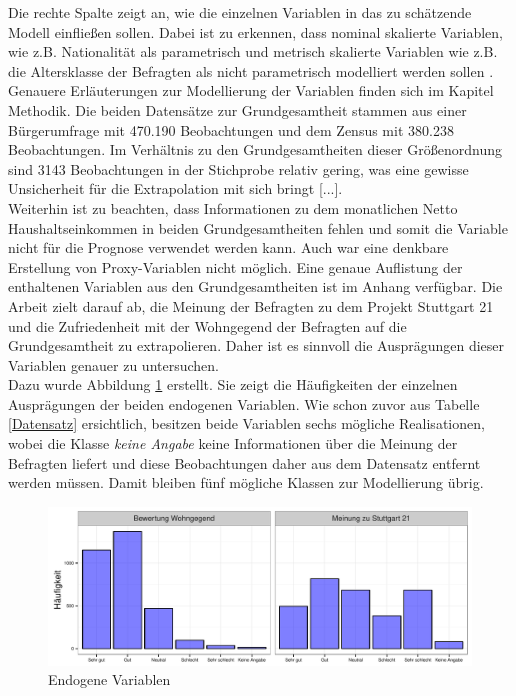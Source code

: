 \documentclass{Vorlage}
\begin{document}
Die rechte Spalte zeigt an, wie die einzelnen Variablen in das zu schätzende Modell einfließen sollen. Dabei ist zu erkennen, dass nominal skalierte Variablen, wie z.B. Nationalität als parametrisch und metrisch skalierte Variablen wie z.B. die Altersklasse der Befragten als nicht parametrisch modelliert werden sollen \cite[p. 9]{fahrmeir2009regression}. Genauere Erläuterungen zur Modellierung der Variablen finden sich im Kapitel Methodik. Die beiden Datensätze zur Grundgesamtheit stammen aus einer Bürgerumfrage mit 470.190 Beobachtungen und dem Zensus mit 380.238 Beobachtungen. Im Verhältnis zu den Grundgesamtheiten  dieser Größenordnung sind 3143 Beobachtungen in der Stichprobe relativ gering, was eine gewisse Unsicherheit für die Extrapolation mit sich bringt [...].\\
Weiterhin ist zu beachten, dass Informationen zu dem monatlichen Netto Haushaltseinkommen in beiden Grundgesamtheiten fehlen und somit die Variable nicht für die Prognose verwendet werden kann. Auch war eine denkbare Erstellung von Proxy-Variablen nicht möglich. Eine genaue Auflistung der enthaltenen Variablen aus den Grundgesamtheiten ist im Anhang verfügbar. Die Arbeit zielt darauf ab, die Meinung der Befragten zu dem Projekt Stuttgart 21 und die Zufriedenheit mit der Wohngegend der Befragten auf die Grundgesamtheit zu extrapolieren. Daher ist es sinnvoll die Ausprägungen dieser Variablen genauer zu untersuchen.\\
Dazu wurde Abbildung \ref{endogene} erstellt. Sie zeigt die Häufigkeiten der einzelnen Ausprägungen der beiden endogenen Variablen. Wie schon zuvor aus Tabelle \ref{Datensatz} ersichtlich, besitzen beide Variablen sechs mögliche Realisationen, wobei die Klasse \textit{keine Angabe} keine Informationen über die Meinung der Befragten liefert und diese Beobachtungen daher aus dem Datensatz entfernt werden müssen. Damit bleiben fünf mögliche Klassen zur Modellierung übrig.

\begin{figure}[h]
 \begin{center}
 \includegraphics[scale=0.8]{Pictures/BarResp}
 \caption{Endogene Variablen}
 \label{endogene}
 \end{center}
\end{figure}
\end{document}
